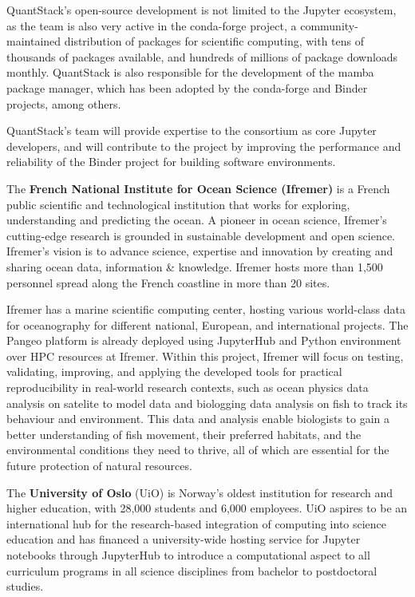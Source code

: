 QuantStack's open-source development is not limited to the Jupyter ecosystem, as the team
is also very active in the conda-forge project, a community-maintained distribution
of packages for scientific computing, with tens of thousands of packages available,
and hundreds of millions of package downloads monthly. QuantStack is also responsible for
the development of the mamba package manager, which has been adopted by the conda-forge
and Binder projects, among others.

QuantStack's team will provide expertise to the consortium as core Jupyter developers,
and will contribute to the project by improving the performance and reliability of the
Binder project for building software environments.

\medskip \noindent
The \textbf{French National Institute for Ocean Science (Ifremer)} is a French public
scientific and technological institution that works for exploring, understanding
and predicting the ocean. A pioneer in ocean science, Ifremer's cutting-edge
research is grounded in sustainable development and open science. Ifremer's
vision is to advance science, expertise and innovation by creating and sharing
ocean data, information \& knowledge. Ifremer hosts more than 1,500 personnel
spread along the French coastline in more than 20 sites.  

Ifremer has a marine scientific computing center, hosting various world-class data for oceanography for different national, European, and international projects.
The Pangeo platform is already deployed using JupyterHub and Python 
environment over HPC resources at Ifremer. 
Within this project, Ifremer will focus on testing, validating, improving, and
applying the developed
tools for practical reproducibility in real-world research contexts,
such as ocean physics data analysis on satelite to model data and biologging data analysis on fish to track its behaviour and environment.   
This data and analysis enable biologists to gain a better understanding of fish movement, their preferred habitats, and the environmental conditions they need to thrive, all of which are essential for the future protection of natural resources.  


\medskip \noindent The \textbf{University of Oslo}
(UiO) is Norway's oldest institution for research and
higher education, with 28,000 students and 6,000 employees. UiO aspires to be an
international hub for the research-based integration of computing into science
education and has financed a university-wide hosting service for Jupyter
notebooks through JupyterHub to introduce a computational aspect to all
curriculum programs in all science disciplines from bachelor to postdoctoral
studies.

